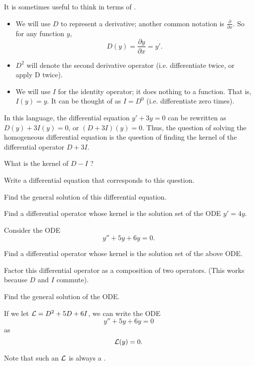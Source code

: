 
\begin{applicationActivities}

\begin{observation}
It is sometimes useful to think in terms of .
\begin{itemize}
\item We will use \(D\) to represent a derivative; another common notation is \(\frac{\partial}{\partial x}\).  So for any function \(y\),  \[D(y)=\frac{\partial y}{\partial x}=y'.\]
\item \(D^2\) will denote the second derivative operator (i.e. differentiate twice, or apply D twice).
\item We will use \(I\) for the identity operator; it does nothing to a function.  That is, \(I(y)=y\).  It can be thought of as \(I=D^0\) (i.e. differentiate zero times).
\end{itemize}
\vfill
In this language, the differential equation \(y'+3y=0\) can be rewritten as \(D(y)+3I(y)=0\), or \( (D+3I)(y)=0\).
\vfill
Thus, the question of solving the homogeneous differential equation is the question of finding the kernel of the differential operator \(D+3I\).
\end{observation}

\begin{activity}{5}
What is the kernel of \(D-I\) ?
\vfill
\begin{subactivity}
Write a differential equation that corresponds to this question.
\end{subactivity}
\begin{subactivity}
Find the general solution of this differential equation.
\end{subactivity}
\end{activity}

\begin{activity}{5}
Find a differential operator whose kernel is the solution set of the ODE \(y'=4y\).
\end{activity}

\begin{activity}{10}
Consider the ODE \[y''+5y+6y=0.\]
\vfill
\begin{subactivity}
Find a differential operator whose kernel is the solution set of the above ODE.
\end{subactivity}
\begin{subactivity}
Factor this differential operator as a composition of two operators. (This works because \(D\) and \(I\) commute).
\end{subactivity}
\begin{subactivity}
Find the general solution of the ODE.
\end{subactivity}
\end{activity}

\begin{observation}
If we let \(\mathcal{L}=D^2+5D+6I\), we can write the ODE \[y''+5y+6y=0\] as \[\mathcal{L}(y)=0.\]

Note that such an \(\mathcal{L}\) is always a .
\end{observation}



\end{applicationActivities}
